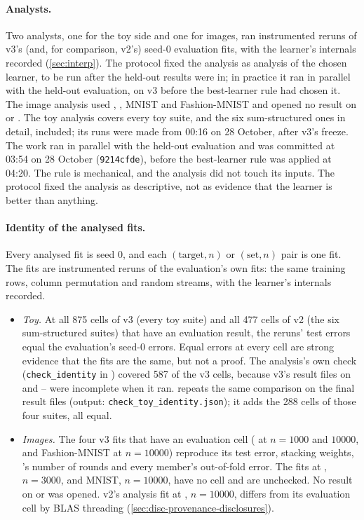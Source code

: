 \paragraph{Analysts.} Two analysts, one for the toy side and one for images, ran instrumented reruns of v3's (and, for comparison, v2's) seed-0 evaluation fits, with the learner's internals recorded (\cref{sec:interp}). The protocol fixed the analysis as analysis of the chosen learner, to be run after the held-out results were in; in practice it ran in parallel with the held-out evaluation, on v3 before the best-learner rule had chosen it. The image analysis used , , MNIST and Fashion-MNIST and opened no result on  or . The toy analysis covers every toy suite, and the six sum-structured ones in detail,  included; its  runs were made from 00:16 on 28 October, after v3's freeze. The work ran in parallel with the held-out evaluation and was committed at 03:54 on 28 October (\texttt{9214cfde}), before the best-learner rule was applied at 04:20. The rule is mechanical, and the analysis did not touch its inputs. The protocol fixed the analysis as descriptive, not as evidence that the learner is better than anything.

\paragraph{Identity of the analysed fits.} Every analysed fit is seed 0, and each $(\text{target},n)$ or $(\text{set},n)$ pair is one fit. The fits are instrumented reruns of the evaluation's own fits: the same training rows, column permutation and random streams, with the learner's internals recorded.
\begin{itemize}
\item \emph{Toy.} At all 875 cells of v3 (every toy suite) and all 477 cells of v2 (the six sum-structured suites) that have an evaluation result, the reruns' test errors equal the evaluation's seed-0 errors. Equal errors at every cell are strong evidence that the fits are the same, but not a proof. The analysis's own check (\texttt{check\_identity} in ) covered 587 of the v3 cells, because v3's result files on  and -- were incomplete when it ran.  repeats the same comparison on the final result files (output: \texttt{check\_toy\_identity.json}); it adds the 288 cells of those four suites, all equal.
\item \emph{Images.} The four v3 fits that have an evaluation cell ( at $n=1000$ and $10000$,  and Fashion-MNIST at $n=10000$) reproduce its test error, stacking weights, 's number of rounds and every member's out-of-fold error. The fits at , $n=3000$, and MNIST, $n=10000$, have no cell and are unchecked. No result on  or  was opened. v2's analysis fit at , $n=10000$, differs from its evaluation cell by BLAS threading (\cref{sec:disc-provenance-disclosures}).
\end{itemize}


